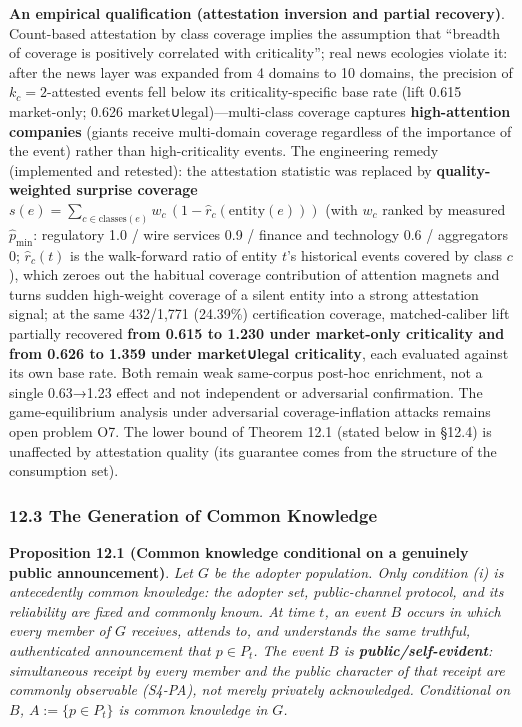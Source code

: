 \documentclass[
  11pt]{article}
\begin{document}
\textbf{An empirical qualification (attestation inversion and partial
recovery)}. Count-based attestation by class coverage implies the
assumption that ``breadth of coverage is positively correlated with
criticality''; real news ecologies violate it: after the news layer was
expanded from 4 domains to 10 domains, the precision of
\(k_c=2\)-attested events fell below its criticality-specific base rate
(lift 0.615 market-only; 0.626 market∪legal)---multi-class coverage
captures \textbf{high-attention companies} (giants receive multi-domain
coverage regardless of the importance of the event) rather than
high-criticality events. The engineering remedy (implemented and
retested): the attestation statistic was replaced by
\textbf{quality-weighted surprise coverage}
\(s(e)=\sum_{c\in\mathrm{classes}(e)} w_c\,(1-\hat r_c(\mathrm{entity}(e)))\)
(with \(w_c\) ranked by measured \(\hat p_{\min}\): regulatory 1.0 /
wire services 0.9 / finance and technology 0.6 / aggregators 0;
\(\hat r_c(t)\) is the walk-forward ratio of entity \(t\)'s historical
events covered by class \(c\)), which zeroes out the habitual coverage
contribution of attention magnets and turns sudden high-weight coverage
of a silent entity into a strong attestation signal; at the same
432/1,771 (24.39\%) certification coverage, matched-caliber lift
partially recovered \textbf{from 0.615 to 1.230 under market-only
criticality and from 0.626 to 1.359 under market∪legal criticality},
each evaluated against its own base rate. Both remain weak same-corpus
post-hoc enrichment, not a single 0.63→1.23 effect and not independent
or adversarial confirmation. The game-equilibrium analysis under
adversarial coverage-inflation attacks remains open problem O7. The
lower bound of Theorem 12.1 (stated below in §12.4) is unaffected by
attestation quality (its guarantee comes from the structure of the
consumption set).

\subsubsection{12.3 The Generation of Common
Knowledge}\label{the-generation-of-common-knowledge}

\textbf{Proposition 12.1 (Common knowledge conditional on a genuinely
public announcement)}. \emph{Let \(G\) be the adopter population. Only
condition (i) is antecedently common knowledge: the adopter set,
public-channel protocol, and its reliability are fixed and commonly
known. At time \(t\), an event \(B\) occurs in which every member of
\(G\) receives, attends to, and understands the same truthful,
authenticated announcement that \(p\in P_t\). The event \(B\) is
\textbf{public/self-evident}: simultaneous receipt by every member and
the public character of that receipt are commonly observable (S4-PA),
not merely privately acknowledged. Conditional on \(B\),
\(A:=\{p\in P_t\}\) is common knowledge in \(G\).}
\end{document}
